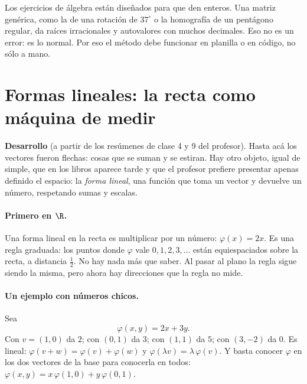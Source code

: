 \begin{atencion}
Los ejercicios de álgebra están diseñados para que den enteros. Una matriz genérica, como
la de una rotación de \(37^\circ\) o la homografía de un pentágono regular, da raíces
irracionales y autovalores con muchos decimales. Eso no es un error: es lo normal. Por eso
el método debe funcionar en planilla o en código, no sólo a mano.
\end{atencion}

\section{Formas lineales: la recta como máquina de medir}\label{sec:formas-lineales}

{\small\vspace{1mm}\par}
{\small\vspace{1mm}\par}


\textbf{Desarrollo} (a partir de los resúmenes de clase 4 y 9 del profesor). Hasta acá los
vectores fueron flechas: cosas que se suman y se estiran. Hay otro objeto, igual de simple,
que en los libros aparece tarde y que el profesor prefiere presentar apenas definido el
espacio: la \emph{forma lineal}, una función que toma un vector y devuelve un número,
respetando sumas y escalas.

\paragraph{Primero en \(\R\).} Una forma lineal en la recta es multiplicar por un número:
\(\varphi(x)=2x\). Es una regla graduada: los puntos donde \(\varphi\) vale
\(0,1,2,3,\ldots\) están equiespaciados sobre la recta, a distancia \(\tfrac12\). No hay
nada más que saber. Al pasar al plano la regla sigue siendo la misma, pero ahora hay
direcciones que la regla no mide.

\paragraph{Un ejemplo con números chicos.} Sea
\[
  \varphi(x,y)=2x+3y .
\]
Con \(v=(1,0)\) da \(2\); con \((0,1)\) da \(3\); con \((1,1)\) da \(5\); con \((3,-2)\)
da \(0\). Es lineal: \(\varphi(v+w)=\varphi(v)+\varphi(w)\) y
\(\varphi(\lambda v)=\lambda\,\varphi(v)\). Y basta conocer \(\varphi\) en los dos vectores
de la base para conocerla en todos: \(\varphi(x,y)=x\,\varphi(1,0)+y\,\varphi(0,1)\).

